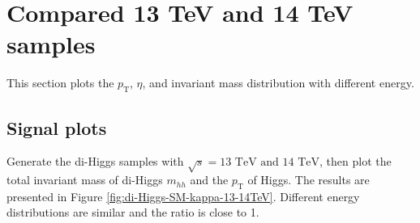 \documentclass[12pt]{article}
\begin{document}
\section{Compared 13 TeV and 14 TeV samples}%
\label{sec:compared_13_tev_and_14_tev_samples}
	This section plots the $p_\text{T}$, $\eta$, and invariant mass distribution with different energy.
	\subsection{Signal plots}%
	\label{sub:signal_plots}
		Generate the di-Higgs samples with $\sqrt{s} = \text{13 TeV and 14 TeV}$, then plot the total invariant mass of di-Higgs $m_{hh}$ and the $p_{\text{T}}$ of Higgs. The results are presented in Figure \ref{fig:di-Higgs-SM-kappa-13-14TeV}. Different energy distributions are similar and the ratio is close to 1.
\end{document}
